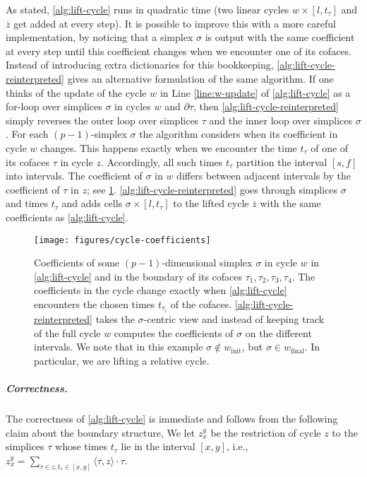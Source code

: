\documentclass[cleveref,a4paper,english,nolineno]{socg-lipics-v2021}
\renewcommand{\paragraph}[1]{\subparagraph*{#1}}
\newcommand{\prism}[1]{\overline{#1}}
\newcommand{\bdry}{\partial}
\newcommand{\pz}{\prism{z}}
\newcommand{\ssx}{\sigma}
\newcommand{\tsx}{\tau}
\newcommand{\coeff}[2]{\langle #1, #2 \rangle}
\newcommand{\winit}{w_\textrm{init}}
\newcommand{\wfinal}{w_\textrm{final}}
\begin{document}
As stated, \cref{alg:lift-cycle} runs in quadratic time (two linear cycles $w
\times [l, t_\tsx]$ and $\pz$ get added at every step). It is possible to
improve this with a more careful implementation, by noticing that a simplex
$\ssx$ is output with the same coefficient at every step until this coefficient
changes when we encounter one of its cofaces.
Instead of introducing extra dictionaries for this bookkeeping,
\cref{alg:lift-cycle-reinterpreted} gives an alternative formulation of the same
algorithm. If one thinks of the update of the cycle $w$ in Line
\ref{line:w-update} of \cref{alg:lift-cycle}
as a for-loop over simplices $\ssx$ in cycles $w$ and $\bdry \tsx$, then
\cref{alg:lift-cycle-reinterpreted} simply reverses the outer loop over
simplices $\tsx$ and the inner loop over simplices $\ssx$. For each
$(p-1)$-simplex $\ssx$ the algorithm considers when its coefficient in cycle $w$ changes.
This happens exactly when we encounter the time $t_\tsx$ of one of its cofaces
$\tsx$ in cycle $z$. Accordingly, all such times $t_\tsx$ partition the interval
$[s,f]$ into intervals. The coefficient of $\ssx$ in $w$ differs between
adjacent intervals by the coefficient of $\tsx$ in $z$; see \cref{fig:cycle-coefficients}.
\cref{alg:lift-cycle-reinterpreted} goes through simplices $\ssx$ and times
$t_\tsx$ and adds cells $\ssx \times [l, t_\tsx]$ to the lifted cycle $\pz$ with
the same coefficients as \cref{alg:lift-cycle}.


\begin{figure}
    \centering
    \texttt{[image: figures/cycle-coefficients]}
    \caption{Coefficients of some $(p-1)$-dimensional simplex $\ssx$ in cycle
             $w$ in \cref{alg:lift-cycle} and in the
             boundary of its cofaces $\tsx_1, \tsx_2, \tsx_3, \tsx_4$. The coefficients
             in the cycle change exactly when \cref{alg:lift-cycle} encounters the
             chosen times $t_{\tsx_i}$ of the cofaces.
             \cref{alg:lift-cycle-reinterpreted} takes the $\ssx$-centric view
             and instead of keeping track of the full cycle $w$ computes the
             coefficients of $\ssx$ on the different intervals.
             We note that in this example $\ssx \notin \winit$,
             but $\ssx \in \wfinal$. In particular, we are lifting a relative cycle.}
    \label{fig:cycle-coefficients}
\end{figure}


\paragraph{Correctness.}
The correctness of \cref{alg:lift-cycle} is immediate and follows from the
following claim about the boundary structure,
We let $z_x^y$ be the restriction of cycle $z$ to the simplices $\tsx$ whose times
$t_\tsx$ lie in the interval $[x,y]$, i.e.,
$z_x^y = \sum_{\tsx \in z, t_\tsx \in [x,y]} \coeff{\tsx}{z} \cdot \tsx$.
\end{document}
